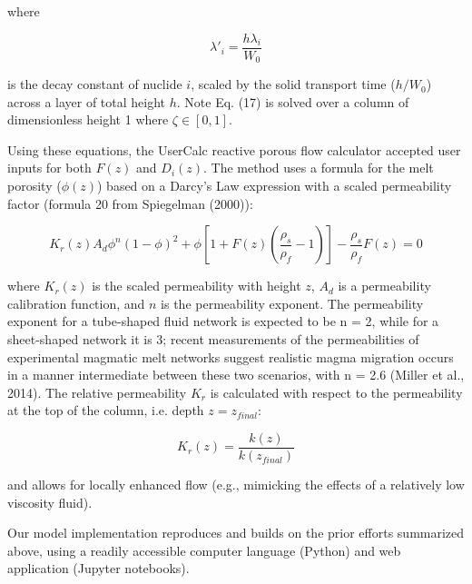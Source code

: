 \documentclass[draft]{agujournal2019}
\begin{document}
where

\begin{linenomath*}
\begin{equation}
    \lambda'_i = \frac{h\lambda_i}{W_0}\label{eq:18}
\end{equation}
\end{linenomath*}

is the decay constant of nuclide $i$, scaled by the solid transport time ($h/W_0$) across a layer of total height $h$. Note Eq. (17) is solved over a column of dimensionless height 1 where $\zeta\in[0,1]$.

Using these equations, the UserCalc reactive porous flow calculator accepted user inputs for both $F(z)$ and $D_i(z)$. The method uses a formula for the melt porosity ($\phi(z)$) based on a Darcy’s Law expression with a scaled permeability factor (formula 20 from Spiegelman (2000)):

\begin{linenomath*}
\begin{equation}
    K_r(z)A_d \phi^n (1-\phi)^2 + \phi [1 + F(z) (\frac{\rho_s}{\rho_f} - 1)] - \frac{\rho_s}{\rho_f}F(z) = 0\label{eq:19}
\end{equation}
\end{linenomath*}

where $K_r(z)$ is the scaled permeability with height $z$, $A_d$ is a permeability calibration function, and $n$ is the permeability exponent. The permeability exponent for a tube-shaped fluid network is expected to be n = 2, while for a sheet-shaped network it is 3; recent measurements of the permeabilities of experimental magmatic melt networks suggest realistic magma migration occurs in a manner intermediate between these two scenarios, with n = 2.6 (Miller et al., 2014). The relative permeability $K_r$ is calculated with respect to the permeability at the top of the column, i.e. depth $z=z_{final}$:

\begin{linenomath*}
\begin{equation}
K_r(z) = \frac{k(z)}{k(z_{final})}\label{eq:20}
\end{equation}
\end{linenomath*}

and allows for locally enhanced flow (e.g., mimicking the effects of a relatively low viscosity fluid).

Our model implementation reproduces and builds on the prior efforts summarized above, using a readily accessible computer language (Python) and web application (Jupyter notebooks).
\end{document}
